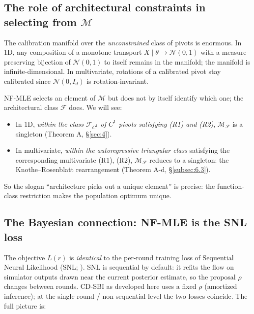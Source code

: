 \documentclass[11pt]{article}
\providecommand{\tightlist}{\setlength{\itemsep}{0pt}\setlength{\parskip}{0pt}}
\begin{document}
\subsection{The role of architectural constraints in selecting from \(\mathcal{M}\)}\label{subsec:3.3}

The calibration manifold over the \emph{unconstrained} class of pivots
is enormous. In 1D, any composition of a monotone transport
\(X \mid \theta \to \mathcal{N}(0,1)\) with a measure-preserving
bijection of \(\mathcal{N}(0,1)\) to itself remains in the manifold; the
manifold is infinite-dimensional. In multivariate, rotations of a
calibrated pivot stay calibrated since \(\mathcal{N}(0, I_d)\) is
rotation-invariant.

NF-MLE selects an element of \(\mathcal{M}\) but does not by itself
identify which one; the architectural class \(\mathcal{F}\) does. We
will see:

\begin{itemize}
\tightlist
\item
  In 1D, \emph{within the class \(\mathcal{F}_{C^1}\) of \(C^1\) pivots
  satisfying (R1) and (R2)}, \(\mathcal{M}_\mathcal{F}\) is a singleton
  (Theorem A, \S\ref{sec:4}).
\item
  In multivariate, \emph{within the autoregressive triangular class}
  satisfying the corresponding multivariate (R1), (R2),
  \(\mathcal{M}_\mathcal{F}\) reduces to a singleton: the
  Knothe--Rosenblatt rearrangement (Theorem A-d, \S\ref{subsec:6.3}).
\end{itemize}

So the slogan ``architecture picks out a unique element'' is precise:
the function-class restriction makes the population optimum unique.

\subsection{The Bayesian connection: NF-MLE is the SNL loss}\label{subsec:3.4}

The objective \(L(r)\) is \emph{identical} to the per-round training
loss of Sequential Neural Likelihood (SNL; \citealp{PapamakariosEtAl2019}).
SNL is sequential by default: it refits the flow on simulator outputs
drawn near the current posterior estimate, so the proposal \(\rho\)
changes between rounds. CD-SBI as developed here uses a fixed \(\rho\)
(amortized inference); at the single-round / non-sequential level the
two losses coincide. The full picture is:
\end{document}
